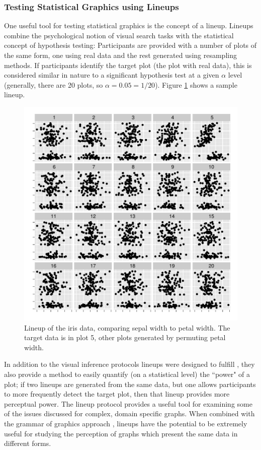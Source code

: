 \documentclass[11pt]{isuthesis}\usepackage[]{graphicx}\usepackage[]{color}
\begin{document}
\subsubsection{Testing Statistical Graphics using Lineups}
One useful tool for testing statistical graphics is the concept of a lineup. Lineups combine the psychological notion of visual search tasks with the statistical concept of hypothesis testing: Participants are provided with a number of plots of the same form, one using real data and the rest generated using resampling methods. If participants identify the target plot (the plot with real data), this is considered similar in nature to a significant hypothesis test at a given $\alpha$ level (generally, there are 20 plots, so $\alpha=0.05 = 1/20$). Figure \ref{fig:lineupexample} shows a sample lineup. 



\begin{figure}[htbp]\centering
\includegraphics[width=.75\textwidth]{fig-irislineup}
\caption[Lineup for testing statistical graphics]{Lineup of the iris data, comparing sepal width to petal width. The target data is in plot 5, other plots generated by permuting petal width.}\label{fig:lineupexample}
\end{figure}
In addition to the visual inference protocols lineups were designed to fulfill \citep{buja2009statistical}, they also provide a method to easily quantify (on a statistical level) the ``power" of a plot; if two lineups are generated from the same data, but one allows participants to more frequently detect the target plot, then that lineup provides more perceptual power. The lineup protocol provides a useful tool for examining some of the issues discussed for complex, domain specific graphs. When combined with the grammar of graphics approach \citep{wickham2010graphical}, lineups have the potential to be extremely useful for studying the perception of graphs which present the same data in different forms.
\end{document}
